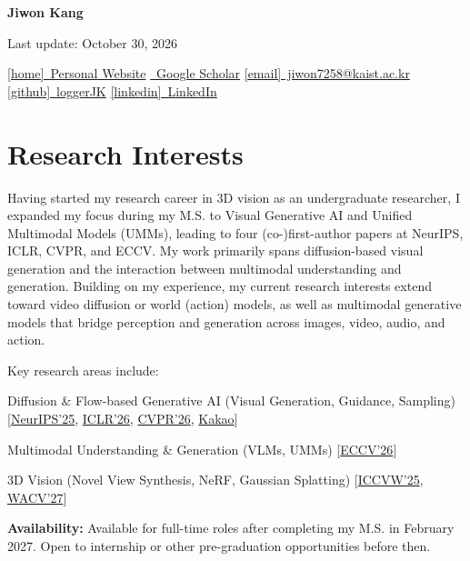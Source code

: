 \documentclass[11pt,letterpaper]{article}
\makeatletter
\providecommand{\faEnvelope}{[email]}\providecommand{\faGithub}{[github]}%
\providecommand{\faLinkedin}{[linkedin]}\providecommand{\faHome}{[home]}}
\newcommand{\lastupdate}{October 30, 2026}
\newcommand{\cvgap}{\hspace{1.5em}}
\newcommand{\cvheader}{%
  {\Huge\bfseries Jiwon Kang}\par
  {\color{cvgray}\small Last update: \lastupdate}\par
  {\small
    \href{https://loggerjk.github.io/}{\faHome\ Personal Website}\cvgap
    \href{https://scholar.google.com/citations?user=A2PurdIAAAAJ}{\faGraduationCap\ Google Scholar}\cvgap
    \href{mailto:jiwon7258@kaist.ac.kr}{\faEnvelope\ jiwon7258@kaist.ac.kr}\cvgap
    \href{https://github.com/loggerJK}{\faGithub\ loggerJK}\cvgap
    \href{https://www.linkedin.com/in/jiwon-kang-b02b0911b/}{\faLinkedin\ LinkedIn}%
  }\par
}
\newcommand{\largesection}[1]{\vspace{1pt} \section{\LARGE#1} \vspace{1pt}}
\makeatother
\begin{document}
\pagestyle{empty}

\cvheader

\largesection{Research Interests}


Having started my research career in 3D vision as an undergraduate researcher, I expanded my focus during my M.S. to Visual Generative AI and Unified Multimodal Models (UMMs), leading to four (co-)first-author papers at NeurIPS, ICLR, CVPR, and ECCV. My work primarily spans diffusion-based visual generation and the interaction between multimodal understanding and generation. Building on my experience, my current research interests extend toward video diffusion or world (action) models, as well as multimodal generative models that bridge perception and generation across images, video, audio, and action.


Key research areas include:
\begin{cvbullets}
  \item Diffusion \& Flow-based Generative AI
  (Visual Generation, Guidance, Sampling)
  [\hyperref[HeadHunter]{NeurIPS'25}, \hyperref[NoiseRefine]{ICLR'26},
   \hyperref[APPLE]{CVPR'26}, \hyperref[Whisper]{Kakao}]
  \item Multimodal Understanding \& Generation
  (VLMs, UMMs)
  [\hyperref[UMM]{ECCV'26}]
  \item 3D Vision
  (Novel View Synthesis, NeRF, Gaussian Splatting)
  [\hyperref[senerf]{ICCVW'25}, \hyperref[RAIN-GS]{WACV'27}]
\end{cvbullets}

\noindent\textbf{Availability:} Available for full-time roles after completing my M.S. in February 2027. Open to internship or other pre-graduation opportunities before then.
\end{document}
